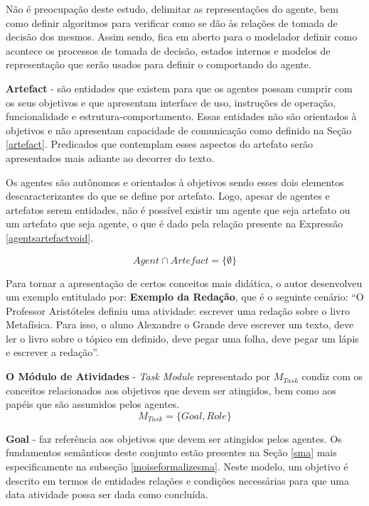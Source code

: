 Não é preocupação deste estudo, delimitar as representações do agente, bem como definir algoritmos para verificar como se dão às relações de tomada de decisão dos mesmos. Assim sendo, fica em aberto para o modelador definir como acontece os processos de tomada de decisão, estados internos e modelos de representação que serão usados para definir o comportando do agente. 

\textbf{Artefact} - são entidades que existem para que os agentes possam cumprir com os seus objetivos e que apresentam interface de uso, instruções de operação, funcionalidade e estrutura-comportamento. Essas entidades não são orientados à objetivos e 
não apresentam capacidade de comunicação como definido na Seção \ref{artefact}. Predicados que contemplam esses aspectos do artefato serão apresentados mais adiante ao decorrer do texto. 

Os agentes são autônomos e orientados à objetivos sendo esses dois elementos descaracterizantes do que se define por artefato. Logo, apesar de agentes e artefatos serem entidades, não é possível existir um agente que seja artefato ou um artefato que seja agente, o que é dado pela relação presente na Expressão \ref{agentsartefactvoid}. 

\begin{equation} \label{agentsartefactvoid}
    Agent \cap Artefact = \{ \emptyset \}
\end{equation}

Para tornar a apresentação de certos conceitos mais didática, o autor desenvolveu um exemplo entitulado por: \textbf{Exemplo da Redação}, que é o seguinte cenário: ``O Professor Aristóteles definiu uma atividade: escrever uma redação sobre o livro Metafísica. Para isso, o aluno Alexandre o Grande deve escrever um texto, deve ler o livro sobre o tópico em definido, deve pegar uma folha, deve pegar um lápis e escrever a redação''.  


\textbf{O Módulo de Atividades} - \textit{Task Module} representado por $M_{Task}$ condiz com os conceitos relacionados aos objetivos que devem ser atingidos, bem como aos papéis que são assumidos pelos agentes.
\begin{equation}
    M_{Task} = \{ Goal, Role \}
\end{equation}

\textbf{Goal} - faz referência aos objetivos que devem ser atingidos pelos agentes. Os fundamentos semânticos deste conjunto estão presentes na Seção \ref{sma} mais especificamente na subseção \ref{moiseformalizesma}. Neste modelo, um objetivo é descrito em termos de entidades relações e condições necessárias para que uma data atividade possa ser dada como concluída. 

